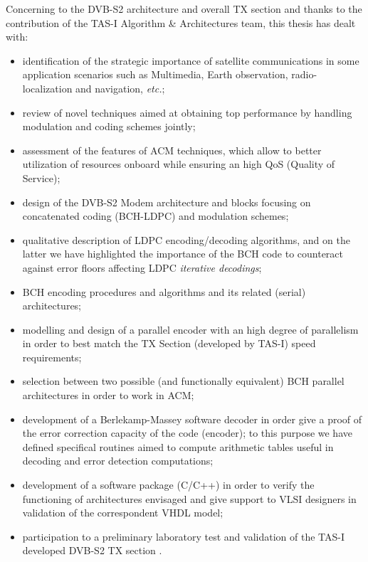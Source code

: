 Concerning to the DVB-S2 architecture and overall TX section and thanks to the contribution of the TAS-I Algorithm \& Architectures team, this thesis has dealt with:
\begin{itemize}
\item identification of the strategic importance of satellite communications in some application scenarios such as Multimedia, Earth observation, radio-localization and navigation, \emph{etc.};
\item review of novel techniques aimed at obtaining top performance by handling modulation and coding schemes jointly;
\item assessment of the features of ACM techniques, which allow to better utilization of resources onboard while ensuring an high QoS (Quality of Service);
\item design of the DVB-S2 Modem architecture and blocks focusing on concatenated coding (BCH-LDPC) and modulation schemes;
\item qualitative description of LDPC encoding/decoding algorithms, and on the latter we have highlighted the importance of the BCH code to counteract against error floors affecting LDPC \emph{iterative decodings};
\item BCH encoding procedures and algorithms and its related (serial) architectures;
\item modelling and design of a parallel encoder with an high degree of parallelism in order to best match the TX Section (developed by TAS-I) speed requirements;
\item selection between two possible (and functionally equivalent) BCH parallel architectures in order to work in ACM;
\item development of a Berlekamp-Massey software decoder in order give a proof of the error correction capacity of the code (encoder); to this purpose we have defined specifical routines aimed to compute arithmetic tables useful in decoding and error detection computations;
\item development of a software package (C/C++) in order to verify the functioning of architectures envisaged and give support to VLSI designers in validation of the correspondent VHDL model;
\item participation to a preliminary laboratory test and validation of the TAS-I developed DVB-S2 TX section  .
\end{itemize}

